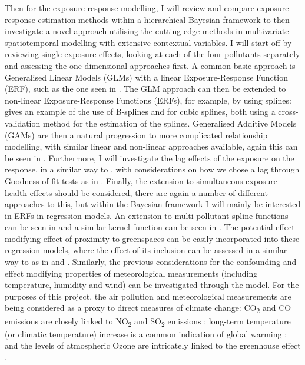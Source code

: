 Then for the exposure-response modelling, I will review and compare exposure-response estimation methods within a hierarchical Bayesian framework to then investigate a novel approach utilising the cutting-edge methods in multivariate spatiotemporal modelling with extensive contextual variables. I will start off by reviewing single-exposure effects, looking at each of the four pollutants separately and assessing the one-dimensional approaches first. A common basic approach is Generalised Linear Models (GLMs) with a linear Exposure-Response Function (ERF), such as the one seen in \cite{Shi2016Low-ConcentrationStudy}. The GLM approach can then be extended to non-linear Exposure-Response Functions (ERFs), for example, by using splines: \cite{Smith2000ThresholdArizona} gives an example of the use of B-splines and \cite{Daniels2000EstimatingCities} for cubic splines, both using a cross-validation method for the estimation of the splines. Generalised Additive Models (GAMs) are then a natural progression to more complicated relationship modelling, with similar linear and non-linear approaches available, again this can be seen in \cite{Smith2000ThresholdArizona}. Furthermore, I will investigate the lag effects of the exposure on the response, in a similar way to \cite{Shi2016Low-ConcentrationStudy}, with considerations on how we chose a lag through Goodness-of-fit tests as in \cite{Richardson2011LaggingAnalyses}. Finally, the extension to simultaneous exposure health effects should be considered, there are again a number of different approaches to this, but within the Bayesian framework I will mainly be interested in ERFs in regression models. An extension to multi-pollutant spline functions can be seen in \cite{Chen2013InfluenceChina} and a similar kernel function can be seen in \cite{Bobb2015BayesianMixtures}. The potential effect modifying effect of proximity to greenspaces can be easily incorporated into these regression models, where the effect of its inclusion can be assessed in a similar way to as in \cite{Ghosh2010PaternalMothers} and \cite{Mariet2021AssociationExposure}. Similarly, the previous considerations for the confounding and effect modifying properties of meteorological measurements (including temperature, humidity and wind) can be investigated through the model. For the purposes of this project, the air pollution and meteorological measurements are being considered as a proxy to direct measures of climate change: CO\textsubscript{2} and CO emissions are closely linked to NO\textsubscript{2} and SO\textsubscript{2} emissions \citep{Chen2007OutdoorEffects}; long-term temperature (or climatic temperature) increase is a common indication of global warming \citep[e.g.][]{Du2019ChangesHiatus}; and the levels of atmospheric Ozone are intricately linked to the greenhouse effect \citep{Meleux2007IncreaseChange}.

